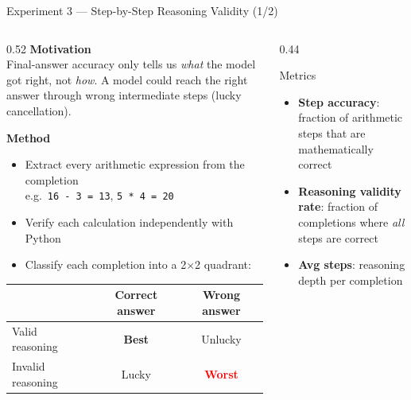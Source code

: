 \documentclass[aspectratio=169,10pt]{beamer}
\begin{document}
\begin{frame}{Experiment 3 — Step-by-Step Reasoning Validity (1/2)}

  \begin{columns}[T]
    \begin{column}{0.52\textwidth}
      \textbf{Motivation}\\[4pt]
      Final-answer accuracy only tells us \emph{what} the model got right,
      not \emph{how}. A model could reach the right answer through
      wrong intermediate steps (lucky cancellation).

      \vspace{0.7em}
      \textbf{Method}
      \begin{itemize}\small
        \item Extract every arithmetic expression from the completion\\
              e.g.\ \texttt{16 - 3 = 13}, \texttt{5 * 4 = 20}
        \item Verify each calculation independently with Python
        \item Classify each completion into a 2$\times$2 quadrant:
      \end{itemize}

      \vspace{0.5em}
      \small
      \begin{tabular}{l|cc}
        & Correct answer & Wrong answer \\
        \hline
        Valid reasoning   & \textcolor{grpogre}{\textbf{Best}}  & Unlucky \\
        Invalid reasoning & Lucky                                & \textcolor{red}{\textbf{Worst}} \\
      \end{tabular}
    \end{column}

    \begin{column}{0.44\textwidth}
      \begin{block}{Metrics}
        \begin{itemize}\small
          \item \textbf{Step accuracy}: fraction of arithmetic
                steps that are mathematically correct
          \item \textbf{Reasoning validity rate}: fraction of
                completions where \emph{all} steps are correct
          \item \textbf{Avg steps}: reasoning depth per completion
        \end{itemize}
      \end{block}
    \end{column}
  \end{columns}
\end{frame}
\end{document}
